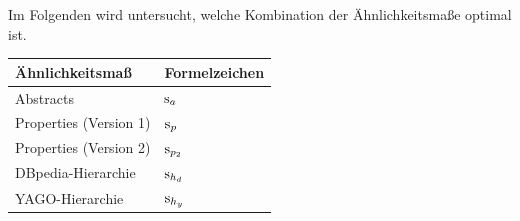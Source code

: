 % 
% 


Im Folgenden wird untersucht, welche Kombination der Ähnlichkeitsmaße optimal ist.

\begin{center}
\begin{tabular}{ll}
\toprule
Ähnlichkeitsmaß		&Formelzeichen\\
\midrule
Abstracts			&$\textnormal{s}_{a}$\\
Properties (Version 1)		&$\textnormal{s}_{p}$\\
Properties (Version 2)		&$\textnormal{s}_{p_2}$\\
DBpedia-Hierarchie		&$\textnormal{s}_{h_d}$\\
YAGO-Hierarchie			&$\textnormal{s}_{h_y}$\\
\bottomrule
\end{tabular}
\end{center}

